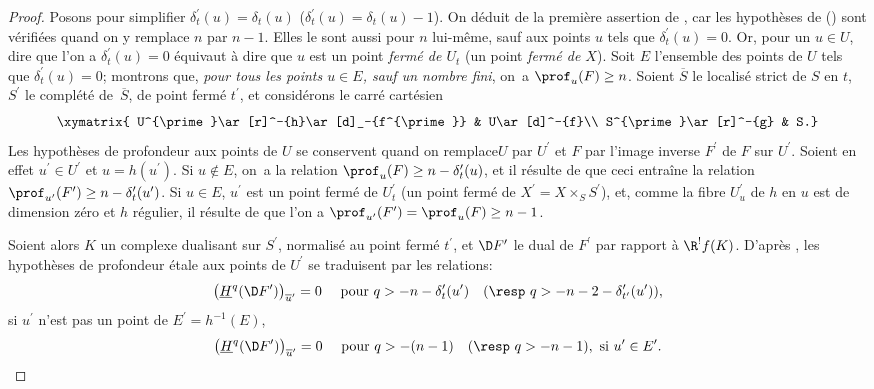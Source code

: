 \begin{proof}
Posons pour simplifier $\delta_{t}^{\prime}(u)=\delta_{t}(u)$ (\resp $\delta_{t}^{\prime}(u)=\delta_{t}(u)-1$). On d\'eduit de  la premi\`ere assertion de , car les hypoth\`eses de  (\resp {}) sont v\'erifi\'ees quand on y remplace $n$ par $n-1$. Elles le sont aussi pour $n$ lui-m\^eme, sauf aux points $u$ tels que $\delta_{t}^{\prime}(u)=0$. Or, pour un $u\in U$, dire que l'on a $\delta_{t}^{\prime}(u)=0$ \'equivaut \`a dire que $u$ est un point \emph{ferm\'e de $U_{t}$} (\resp un point \emph{ferm\'e de $X$}). Soit $E$ l'ensemble des points de $U$ tels que $\delta_{t}^{\prime}(u)=0$; montrons que, \emph{pour tous les points $u\in E$, sauf un nombre fini}, on~a $\prof_{u}(F)\geq n$. Soient $\overline{S}$ le localis\'e strict de $S$ en $t$, $S^{\prime}$ le compl\'et\'e de~$\overline{S}$, de point ferm\'e $t^{\prime}$, et consid\'erons le carr\'e cart\'esien
$$
\xymatrix{ U^{\prime}\ar[r]^-{h}\ar[d]_-{f^{\prime}} & U\ar[d]^-{f}\\
S^{\prime}\ar[r]^-{g} & S.}$$
Les hypoth\`eses de profondeur aux points de $U$ se conservent quand on remplace\pageoriginale $U$ par $U^{\prime}$ et $F$ par l'image inverse $F^{\prime}$ de $F$ sur $U^{\prime}$. Soient en effet $u^{\prime}\in U^{\prime}$ et $u=h(u^{\prime})$. Si $u\not\in E$, on~a la relation $\prof_{u}(F)\geq n-\delta_{t}^{\prime}(u)$, et il r\'esulte de  que ceci entra\^ine la relation $\prof_{u^{\prime}}(F^{\prime})\geq n-\delta_{t}^{\prime}(u^{\prime})$. Si $u\in E$, $u^{\prime}$ est un point ferm\'e de $U_{t}^{\prime}$ (\resp un point ferm\'e de $X^{\prime}=X\times_{S}S^{\prime}$), et, comme la fibre $U_{u}^{\prime}$ de $h$ en $u$ est de dimension z\'ero et $h$ r\'egulier, il r\'esulte de  que l'on a $\prof_{u^{\prime}}(F^{\prime})=\prof_{u}(F)\geq n-1$.

Soient alors $K$ un complexe dualisant sur $S^{\prime}$, normalis\'e au point ferm\'e $t^{\prime}$, et $\D F^{\prime}$ le dual de $F^{\prime}$ par rapport \`a $\R^{!}f(K)$. D'apr\`es , les hypoth\`eses de profondeur \'etale aux points de $U^{\prime}$ se traduisent par les relations:
$$
\big(\underline{H}^{q}(\D F^{\prime})\big)_{\overline{u}^{\prime}}=0\quad\textrm{ pour }q>-n-\delta_{t}^{\prime}(u^{\prime})\quad(\textrm{\resp }q>-n-2-\delta_{t^{\prime}}^{\prime}(u^{\prime})),
$$
si $u^{\prime}$ n'est pas un point de $E^{\prime}=h^{-1}(E)$,
$$
\big(\underline{H}^{q}(\D F^{\prime})\big)_{\overline{u}^{\prime}}=0\quad\textrm{ pour }q>-(n-1)\quad(\textrm{\resp }q>-n-1), \textrm{ si }u^{\prime}\in E^{\prime}.
$$


\end{proof}
